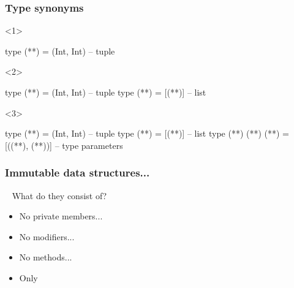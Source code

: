 \documentclass[17pt]{beamer}
\renewcommand{\(}[1]{\begin{columns}[#1]}
\renewcommand{\)}{\end{columns}}
\newcommand{\<}[1]{\begin{column}{#1}}
\renewcommand{\>}{\end{column}}
\begin{document}
\begin{frame}[fragile]
  \frametitle{Type synonyms}
  \begin{onlyenv}<1>
    \begin{code}
type (**)   = (Int, Int)  -- tuple
    \end{code}
  \end{onlyenv}
  \begin{onlyenv}<2>
    \begin{code}
type (**)   = (Int, Int)  -- tuple
type (**) = [(**)]     -- list
    \end{code}
  \end{onlyenv}
  \begin{onlyenv}<3>
    \begin{code}
type (**)   = (Int, Int)  -- tuple
type (**) = [(**)]     -- list
type (**) (**) (**) = [((**), (**))]    -- type parameters
    \end{code}
  \end{onlyenv}
\end{frame}

\begin{frame}
  \frametitle{Immutable data structures...}
  \begin{center}
    {~ What do they consist of?}
    \begin{itemize}
      \item<2-> No private members...
      \item<3-> No modifiers...
      \item<4-> No methods...
      \item<5-> Only 
    \end{itemize}
  \end{center}
\end{frame}
\end{document}
